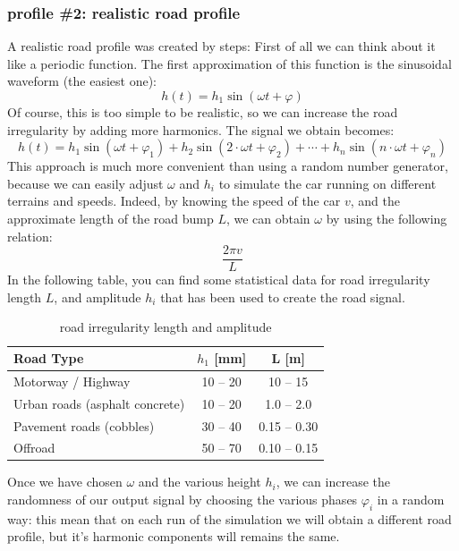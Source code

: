 \documentclass{article}
\numberwithin{equation}{section}
\numberwithin{figure}{section}
\numberwithin{table}{section}
\numberwithin{table}{section}
\begin{document}
\subsubsection{profile \#2: realistic road profile}
A realistic road profile was created by steps: First of all we can think about it like a periodic function. The first approximation of this function is the sinusoidal waveform (the easiest one):
\begin{equation}
    h(t)=h_1 \sin(\omega t + \varphi)
\end{equation}
Of course, this is too simple to be realistic, so we can increase the road irregularity by adding more harmonics. The signal we obtain becomes:
\begin{equation}
    h(t)=h_1 \sin(\omega t + \varphi_1)+h_2 \sin(2\cdot\omega t + \varphi_2)+ \cdots + h_n \sin(n\cdot\omega t + \varphi_n)
\end{equation}
This approach is much more convenient than using a random number generator, because we can easily adjust $\omega$ and $h_i$ to simulate the car running on different terrains and speeds. Indeed, by knowing the speed of the car $v$, and the approximate length of the road bump $L$, we can obtain $\omega$ by using the following relation:
\begin{equation}
    \frac{2\pi v}{L}
\end{equation}
In the following table, you can find some statistical data for road irregularity length $L$, and amplitude $h_i$ that has been used to create the road signal.
\begin{table}[H]
    \centering
    \begin{tabular}{|l|c|c|}
         \hline
         \textbf{Road Type}& \textbf{$h_1$ [mm]} &	\textbf{L [m]}\\
         \hline
         \hline
         Motorway / Highway& 10 – 20 & 10 – 15\\
         \hline
         Urban roads (asphalt concrete)& 10 – 20 & 	1.0 – 2.0\\
         \hline
         Pavement roads (cobbles)& 30 – 40 & 0.15 – 0.30\\
         \hline
         Offroad& 50 – 70 & 0.10 – 0.15\\
         \hline
    \end{tabular}
    \caption{road irregularity length and amplitude\cite{road_profiles}}
    \label{tab:road_stats}
\end{table}
Once we have chosen $\omega$ and the various height $h_i$, we can increase the randomness of our output signal by choosing the various phases $\varphi_i$ in a random way: this mean that on each run of the simulation we will obtain a different road profile, but it's harmonic components will remains the same.
\end{document}
